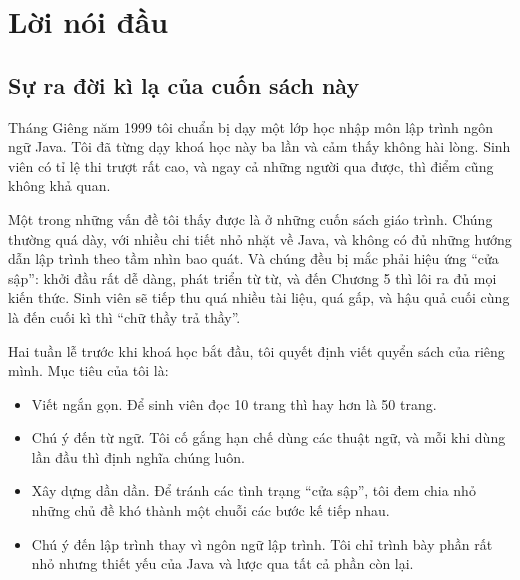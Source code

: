 \documentclass[11pt]{book}
\newcommand{\thetitle}{Tư duy trong Python: Nhập môn thiết kế phần mềm}
\newcommand{\theversion}{1.1.14--28}
\begin{document}









\chapter{Lời nói đầu}

\section*{Sự ra đời kì lạ của cuốn sách này}

Tháng Giêng năm 1999 tôi chuẩn bị dạy một lớp học nhập môn lập trình
ngôn ngữ Java.  Tôi đã từng dạy khoá học này ba lần và cảm thấy không 
hài lòng.  Sinh viên có tỉ lệ thi trượt rất cao, và ngay cả những người qua
được, thì điểm cũng không khả quan.

Một trong những vấn đề tôi thấy được là ở những cuốn sách giáo trình.
Chúng thường quá dày, với nhiều chi tiết nhỏ nhặt về Java, và 
không có đủ những hướng dẫn lập trình theo tầm nhìn bao quát.
Và chúng đều bị mắc phải hiệu ứng ``cửa sập'': khởi đầu rất dễ dàng,
phát triển từ từ, và đến Chương 5 thì lôi ra đủ mọi kiến thức.
Sinh viên sẽ tiếp thu quá nhiều tài liệu, quá gấp, và hậu quả cuối cùng
là đến cuối kì thì ``chữ thầy trả thầy''.

Hai tuần lễ trước khi khoá học bắt đầu, tôi quyết định viết quyển
sách của riêng mình.
Mục tiêu của tôi là:

\begin{itemize}

\item Viết ngắn gọn. Để sinh viên đọc 10 trang thì hay hơn là 50 trang.

\item Chú ý đến từ ngữ. Tôi cố gắng hạn chế dùng các thuật ngữ, và 
mỗi khi dùng lần đầu thì định nghĩa chúng luôn.

\item Xây dựng dần dần. Để tránh các tình trạng ``cửa sập'', tôi đem chia
nhỏ những chủ đề khó thành một chuỗi các bước kế tiếp nhau.

\item Chú ý đến lập trình thay vì ngôn ngữ lập trình. Tôi chỉ trình bày
phần rất nhỏ nhưng thiết yếu của Java và lược qua tất cả phần còn lại.

\end{itemize}
\end{document}
